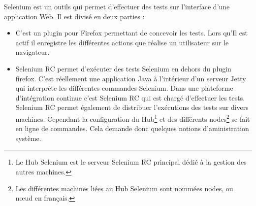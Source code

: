 Selenium est un outils qui permet d'effectuer des tests sur l'interface d'une application Web. Il 
est divisé en deux parties :
\begin{itemize}
	\item {}
		C'est un plugin pour Firefox permettant de concevoir les tests. Lors qu'Il est actif il enregistre
		les différentes actions que réalise un utilisateur sur le navigateur.
		
	\item {}
		Selenium RC permet d'exécuter des tests Selenium en dehors du plugin firefox. C'est réellement une
		application Java à l'intérieur d'un serveur Jetty qui interprète les différentes commandes Selenium.
		Dans une plateforme d'intégration continue c'est Selenium RC qui est chargé d'effectuer les tests.
		Selenium RC permet également de distribuer l'exécutions des tests sur divers machines. Cependant
		la configuration du Hub\footnote{Le Hub Selenium est le serveur Selenium RC principal dédié à la gestion
		des autres machines.} et des différents nodes\footnote{Les différentes machines liées au Hub Selenium sont
		nommées nodes, ou nœud en français.} se fait en ligne de commandes. Cela demande donc quelques notions
		d'aministration système.
 		
\end{itemize}
